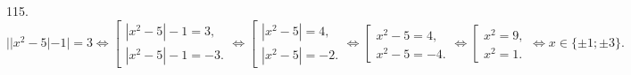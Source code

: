 115. $||x^2-5|-1|=3\Leftrightarrow \left[\begin{array}{l}|x^2-5|-1=3,\\ |x^2-5|-1=-3.\end{array}\right. \Leftrightarrow \left[\begin{array}{l}|x^2-5|=4,\\ |x^2-5|=-2.\end{array}\right.\Leftrightarrow \left[\begin{array}{l}x^2-5=4,\\ x^2-5=-4.\end{array}\right.\Leftrightarrow \left[\begin{array}{l}x^2=9,\\ x^2=1.\end{array}\right.\Leftrightarrow x\in\{\pm1;\pm3\}.$\\
